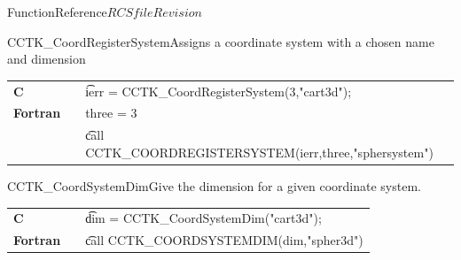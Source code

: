 \begin{cactuspart}{FunctionReference}{$RCSfile$}{$Revision$}
\begin{CCTKFunc}{CCTK\_CoordRegisterSystem}{Assigns a coordinate system with
a chosen name and dimension}
\label{CCTK-CoordRegisterSystem}
\showargs
\begin{params}
\end{params}
\begin{discussion}
\end{discussion}
\begin{examples}
\begin{tabular}{@{}p{3cm}cp{11cm}}
\hfill {\bf C} && {\t ierr = CCTK\_CoordRegisterSystem(3,"cart3d")};
\\
\hfill {\bf Fortran} && three = 3
\\
&&{\t call CCTK\_COORDREGISTERSYSTEM(ierr,three,"sphersystem")}
\\
\end{tabular}
\end{examples}
\begin{errorcodes}
\end{errorcodes}
\end{CCTKFunc}

\begin{CCTKFunc}{CCTK\_CoordSystemDim}{Give the dimension for a given coordinate system.}
\label{CCTK-CoordDim}
\showargs
\begin{params}
\end{params}
\begin{discussion}
\end{discussion}
\begin{examples}
\begin{tabular}{@{}p{3cm}cp{11cm}}
\hfill {\bf C} && {\t dim = CCTK\_CoordSystemDim("cart3d")};
\\
\hfill {\bf Fortran} && {\t call  CCTK\_COORDSYSTEMDIM(dim,"spher3d")}
\\
\end{tabular}
\end{examples}
\begin{errorcodes}
\end{errorcodes}
\end{CCTKFunc}


\end{cactuspart}

